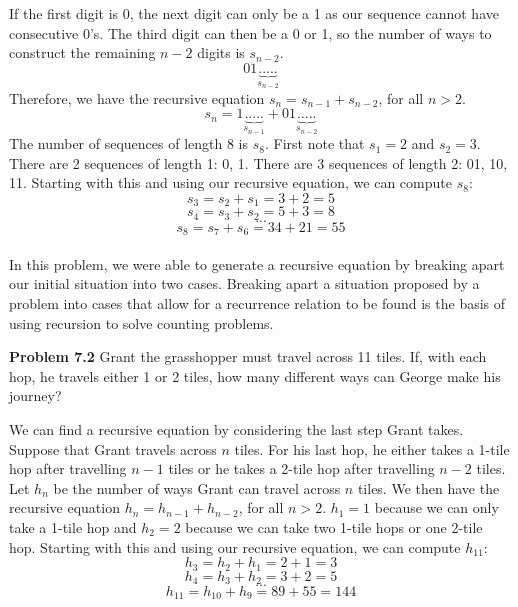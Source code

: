 \documentclass[11pt]{scrartcl}
\begin{document}
If the first digit is 0, the next digit can only be a 1 as our sequence cannot have consecutive 0's. The third digit can then be a 0 or 1, so the number of ways to construct the remaining $n-2$ digits is $s_{n-2}$. 
$$01{\underbrace{.....}_{s_{n-2}}}$$
Therefore, we have the recursive equation ${s_n}={s_{n-1}}+s_{n-2}$, for all $n > 2$. 
$$s_n=1{\underbrace{.....}_{s_{n-1}}}+01{\underbrace{.....}_{s_{n-2}}}$$
The number of sequences of length 8 is $s_8$. First note that ${s_1}=2$ and ${s_2}=3$. There are 2 sequences of length 1: 0, 1. There are 3 sequences of length 2: 01, 10, 11. Starting with this and using our recursive equation, we can compute $s_8$:
$${s_3}={s_2}+{s_1}=3+2=5$$
$${s_4}={s_3}+{s_2}=5+3=8$$
$$...$$
$${s_8}={s_7}+{s_6}=34+21=55$$\\
\noindent
In this problem, we were able to generate a recursive equation by breaking apart our initial situation into two cases. Breaking apart a situation proposed by a problem into cases that allow for a recurrence relation to be found is the basis of using recursion to solve counting problems.  
\\
\begin{tcolorbox}
\textbf{Problem 7.2} Grant the grasshopper must travel across 11 tiles. If, with each hop, he travels either 1 or 2 tiles, how many different ways can George make his journey?
\end{tcolorbox}
\noindent 
We can find a recursive equation by considering the last step Grant takes. Suppose that Grant travels across $n$ tiles. For his last hop, he either takes a 1-tile hop after travelling $n-1$ tiles or he takes a 2-tile hop after travelling $n-2$ tiles. Let $h_n$ be the number of ways Grant can travel across $n$ tiles. We then have the recursive equation ${h_n}={h_{n-1}}+{h_{n-2}}$, for all $n > 2$. ${h_1}=1$ because we can only take a 1-tile hop and ${h_2}=2$ because we can take two 1-tile hops or one 2-tile hop. Starting with this and using our recursive equation, we can compute $h_{11}$:
$${h_3}={h_2}+{h_1}=2+1=3$$
$${h_4}={h_3}+{h_2}=3+2=5$$
$$...$$
$${h_{11}}={h_{10}}+{h_9}=89+55=144$$
\end{document}

